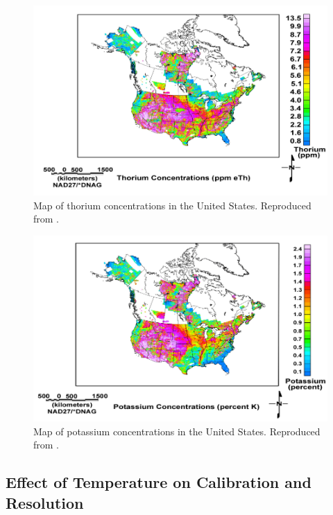 \begin{figure}[H]
\centering
\includegraphics[trim=10 0 5 0, clip, width=1.0\linewidth]{images/USGS_th_conc}
\caption{Map of thorium concentrations in the United States. Reproduced from \cite{USGS}.}
\label{fig:USGS_th_conc}
\end{figure}

\begin{figure}[H]
\centering
\includegraphics[trim=10 0 5 0, clip, width=1.0\linewidth]{images/USGS_k_conc}
\caption{Map of potassium concentrations in the United States. Reproduced from \cite{USGS}.}
\label{fig:USGS_k_conc}
\end{figure}



\subsection{Effect of Temperature on Calibration and Resolution}

